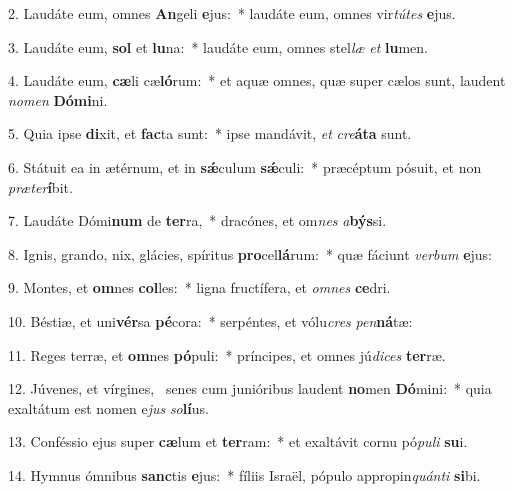 2. Laudáte eum, omnes \textbf{An}geli \textbf{e}jus:~*  laudáte eum, omnes vir\textit{tú}\textit{tes} \textbf{e}jus.\

3. Laudáte eum, \textbf{sol} et \textbf{lu}na:~*  laudáte eum, omnes stel\textit{læ} \textit{et} \textbf{lu}men.\

4. Laudáte eum, \textbf{cæ}li cæ\textbf{ló}rum:~*  et aquæ omnes, quæ super cælos sunt, laudent \textit{no}\textit{men} \textbf{Dó}\textbf{mi}ni.\

5. Quia ipse \textbf{di}xit, et \textbf{fac}ta sunt:~*  ipse mandávit, \textit{et} \textit{cre}\textbf{á}\textbf{ta} sunt.\

6. Státuit ea in ætérnum, et in \textbf{sǽ}culum \textbf{sǽ}culi:~*  præcéptum pósuit, et non \textit{præ}\textit{ter}\textbf{í}bit.\

7. Laudáte Dómi\textbf{num} de \textbf{ter}ra,~*  dracónes, et om\textit{nes} \textit{a}\textbf{býs}si.\

8. Ignis, grando, nix, glácies, spíritus \textbf{pro}cel\textbf{lá}rum:~*  quæ fáciunt \textit{ver}\textit{bum} \textbf{e}jus:\

9. Montes, et \textbf{om}nes \textbf{col}les:~*  ligna fructífera, et \textit{om}\textit{nes} \textbf{ce}dri.\

10. Béstiæ, et uni\textbf{vér}sa \textbf{pé}cora:~*  serpéntes, et vólu\textit{cres} \textit{pen}\textbf{ná}tæ:\

11. Reges terræ, et \textbf{om}nes \textbf{pó}puli:~*  príncipes, et omnes jú\textit{di}\textit{ces} \textbf{ter}ræ.\

12. Júvenes, et vírgines, \dag\  senes cum junióribus laudent \textbf{no}men \textbf{Dó}mini:~*  quia exaltátum est nomen e\textit{jus} \textit{so}\textbf{lí}us.\

13. Conféssio ejus super \textbf{cæ}lum et \textbf{ter}ram:~*  et exaltávit cornu pó\textit{pu}\textit{li} \textbf{su}i.\

14. Hymnus ómnibus \textbf{sanc}tis \textbf{e}jus:~*  fíliis Israël, pópulo appropin\textit{quán}\textit{ti} \textbf{si}bi.\

